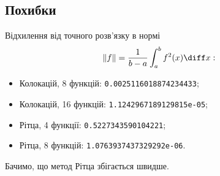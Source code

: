 \subsection{Похибки}
Відхилення від точного розв'язку в нормі 
\begin{equation}
    \|f\| = \frac{1}{b - a} \int_a^b f^2(x) \diff x:
\end{equation}
\begin{itemize}
    \item Колокацій, 8 функцій: \texttt{0.0025116018874234433};
    \item Колокацій, 16 функцій: \texttt{1.1242967189129815e-05};
    \item Рітца, 4 функції: \texttt{0.5227343590104221};
    \item Рітца, 8 функцій: \texttt{1.0763937437329292e-06}.
\end{itemize}

Бачимо, що метод Рітца збігається швидше.

